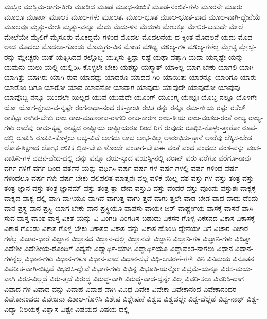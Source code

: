 {ಮುಸ್ಲಿಂ
ಮುಸ್ಲಿಮ-ರಾಗು-ತ್ತೀರಿ
ಮೂಡಿದ
ಮೂಢ
ಮೂಢ-ನಂಬಿಕೆ
ಮೂಢ-ನಂಬಿಕೆ-ಗಳು
ಮೂರನೇ
ಮೂರು
ಮೂರೂ
ಮೂರ್ಖ
ಮೂಲಕ
ಮೂಲ-ಗಳು
ಮೂಲತಃ
ಮೂಲ-ಭೂತ
ಮೂಲ-ಭೂತ-ವಾದ
ಮೂಲ-ವಾಗಿ-ದ್ದೇನೆಯೆ
ಮೂಲವೂ
ಮೃತ್ಯು-ಮೇತಿ
ಮೃತ್ಯು-ವನ್ನೂ
ಮೆದು
ಮೆದು-ಳಿನ
ಮೆದುಳು
ಮೇಲಕ್ಕೂ
ಮೇಲಿರ-ಬಹುದೇ
ಮೇಲೆ
ಮೇಲೆಯೇ
ಮೈಲಿಗೆ
ಮೈಸೂರು
ಮೊಕದ್ದಮೆ-ಗಳಿಂದ
ಮೊದಲ
ಮೊದಲನೆಯ-ದ-ಕ್ಕಿಂತ
ಮೊದಲನೆ-ಯದು
ಮೊದ-ಲಾದ
ಮೊದಲು
ಮೊದಲು-ಗೊಂಡು
ಮೊಮ್ಮಗು-ವಿನ
ಮೋಹ
ಮೌಢ್ಯ
ಮೌಲ್ಯ-ಗಳ
ಮೌಲ್ಯ-ಗಳೆಲ್ಲ
ಮ್ಲೇಚ್ಛ
ಮ್ಲೇಚ್ಛ-ರನ್ನು
ಮ್ಲೇಚ್ಛರು
ಯತೆ
ಯತ್ನಿಸಿದವ-ರಲ್ಲೊಬ್ಬ
ಯತ್ನಿಸು-ತ್ತಿದ್ದಾ-ರಷ್ಟೆ
ಯಥಾ-ವತ್ತಾಗಿ
ಯದಾ
ಯನ್ನಷ್ಟೇ
ಯನ್ನು
ಯಮನು
ಯಲು
ಯಲ್ಲಿ
ಯಲ್ಲಿರಿಸಿ-ಕೊಳ್ಳಲೇ-ಬೇಕು
ಯಶಸ್ಸು
ಯಸ್ಮಾತ್
ಯಾಕಿಲ್ಲ
ಯಾಗ-ಬೇಕು
ಯಾಗಲಿ
ಯಾಗಿ
ಯಾಗಿತ್ತು
ಯಾಗಿರು
ಯಾಗಿ-ರುವ
ಯಾದದ್ದು
ಯಾದರೂ
ಯಾದವ-ಗಿರಿ
ಯಾಯಿತು
ಯಾರನ್ನೂ
ಯಾರಿಗೂ
ಯಾರು
ಯಾರೊಂ-ದಿಗೂ
ಯಾರೋ
ಯಾವ
ಯಾವನೋ
ಯಾವಾಗ
ಯಾವುದು
ಯಾವುದೇ
ಯಾವುದೋ
ಯಾವುವು
ಯಾವೊಬ್ಬ-ನನ್ನೂ
ಯಿಂದಲೇ
ಯಿಲ್ಲದ
ಯುವ
ಯುವುದೇ
ಯೂಂಗ್
ಯೂಂಗ್ನ
ಯೇಭ್ಯಃ
ಯೊಬ್ಬ-ನಲ್ಲೂ
ಯೊಳಗೇ
ಯೋ
ಯೋಗ-ಕ್ಷೇಮ-ವ-ನ್ನಷ್ಟೇ
ರಂಗನಾಥಾ-ನಂದ
ರಕ್ತ-ಕ್ರಾಂತಿ
ರಚಿತ
ರನ್ನು
ರನ್ನೂ
ರಮ-ಣೀಯ
ರಷ್ಟು
ರಸೆಲ್
ರಾಕೆಟ್ಟು
ರಾಗಿರ-ಬೇಕು
ರಾಜ
ರಾಜ-ಮಹಾರಾಜ-ರಾಗಲಿ
ರಾಜ-ಕಾರಣ
ರಾಜ-ಕೀಯ
ರಾಜ-ವಂಶಜ-ರಂತೆ
ರಾಜ್ಯ
ರಾಜ್ಯ-ಗಳು
ರಾದೆವು
ರಾಮ-ಕೃಷ್ಣ
ರಾಷ್ಟ್ರದ
ರಾಷ್ಟ್ರೀಯ
ರಾಷ್ಟ್ರೀಯರೂ
ರಿಂದ
ರಿಗೆ
ರುವುದು
ರೂಢಿಸಿ-ಕೊಳ್ಳು-ತ್ತಾರೋ
ರೂಪ-ದಲ್ಲಿ
ರೂಪಿಸಿ
ರೂಪಿಸಿ-ಕೊಳ್ಳಲು
ಲಭ್ಯ-ವಿವೆ
ಲಾಗದು
ಲಾಭ
ಲಾಭ-ವಿಲ್ಲ
ಲಾರಂಭಿಸು-ತ್ತಾನೆ
ಲಾರೆವು
ಲೆಕ್ಕಿಸ-ಬೇಡ
ಲೋಕ-ಶಿಕ್ಷಣದ
ಲೋಭ
ಲೌಕಿಕ
ಲ್ಲಿಡ-ಬೇಕು
ಳೊಂದೇ
ವಂತಾಗ-ಬೇಕುಈ
ವಂತೆ
ವಂಥ
ವಂಥದು
ವಂಶ-ವನ್ನು
ವಂಶ-ವಾಹಿನಿ-ಗಳ
ವಚನ-ವೇದ-ದಲ್ಲಿ
ವನ್ನು
ವನ್ನೂ
ವಯ-ಸ್ಸಾದ
ವಯಸ್ಸಿ-ನಲ್ಲಿ
ವರಾನ್
ವರು
ವರೆಗೂ
ವರೆಗೂ-ನಾವು
ವರ್ಗ-ಗಳಿಗೆ
ವರ್ಗ-ದಿಂದ
ವರ್ತನೆ-ಯನ್ನು
ವರ್ಧಿಸಿ
ವರ್ಷ
ವರ್ಷ-ಗಳ
ವರ್ಷ-ಗಳಲ್ಲಿ
ವರ್ಷ-ಗಳಿಂದ
ವರ್ಷ-ಗಳಿಂದಲೂ
ವರ್ಷ-ಗಳು
ವರ್ಷ-ಬೇಕು
ವಲಿಪಲಿತ-ಮಾತ್ಮನಃ
ವಲ್ಲ
ವಳಿಕೆ-ಯಿಲ್ಲ
ವಶ
ವಸ್ತು-ಗಳ
ವಸ್ತು-ತಂತ್ರ
ವಸ್ತು-ತಂತ್ರ-ಜ್ಞಾನ
ವಸ್ತು-ತಂತ್ರ-ಜ್ಞಾನಮ್
ವಸ್ತು-ತಂತ್ರ-ತ್ವಾ-ದೇವ
ವಸ್ತುವಿ
ವಸ್ತು-ವೆಂದರೆ
ವಸ್ತು-ವೊಂದು
ವಸ್ತುಶಃ
ವಾಕ್ಯಕ್ಕೆ
ವಾಕ್ಯದ
ವಾಕ್ಯ-ದಲ್ಲಿ
ವಾಗಿ
ವಾಗಿಯೂ
ವಾಗಿವೆ
ವಾಗುತ್ತ
ವಾಗು-ತ್ತದೆ
ವಾಗು-ತ್ತಲೇ
ವಾಡ-ಬೇಡ
ವಾದ
ವಾದು-ದೆಂದು
ವಾನ-ಪ್ರಸ್ಥ
ವಾನ-ಪ್ರಸ್ಥಿ-ಯಾಗ-ಬೇಕು
ವಾನ-ಪ್ರಸ್ಥಿಯೂ
ವಾಪಸು
ವಾಯೇ-ಜರ್
ವಾರ್ಷ್ಣೇಯ
ವಾಸಕ್ಕೆ
ವಾಸನೆ
ವಾಸಿ-ಸುವ
ವಾಸ್ತ-ವಾಂಶ
ವಾಸ್ತ-ವಿಕತೆ-ಯನ್ನು
ವಿ
ವಿಂಗಡಿ
ವಿಂಗಡಿಸ-ಬಹುದು
ವಿಕಸನ-ಗೊಳ್ಳ
ವಿಕಸನದ
ವಿಕಾಸ
ವಿಕಾಸಕ್ಕೆ
ವಿಕಾಸ-ಗೊಂಡು
ವಿಕಾಸ-ಗೊಳ್ಳ-ಬೇಕು
ವಿಕಾಸದ
ವಿಕಾಸ-ವನ್ನು
ವಿಕಾಸ-ಹೊಂದಿ-ದ್ದೇನೆಯೇ
ವಿಗೆ
ವಿಚಾರ
ವಿಚಾರ-ಗಳೆಲ್ಲ
ವಿಚಾರ-ಧಾರೆ
ವಿಜ್ಞಾನ
ವಿಜ್ಞಾನದ
ವಿಜ್ಞಾನ-ದಲ್ಲಿ
ವಿಜ್ಞಾನವೇ
ವಿಜ್ಞಾನಿ
ವಿಜ್ಞಾನಿ-ಗಳ
ವಿಜ್ಞಾನಿ-ಗಳು
ವಿದಿತ್ವಾ
ವಿದೇಶೀ
ವಿದೇಶೀಯ-ರೊಂದಿಗೆ
ವಿದ್ಯತೇ
ವಿದ್ಯಾರ್ಥಿ-ಯಾಗಿ
ವಿದ್ಯಾರ್ಥಿಯೂ
ವಿದ್ಯಾವಂತ-ನಾಗಲು
ವಿಧಾನ
ವಿಧಾನ-ಗಳನ್ನೆಲ್ಲ
ವಿಧಾನ-ಗಳು
ವಿಧಾನ-ಗಳೂ
ವಿಧಾನ-ವಾದ
ವಿಧಾನ-ಸಭೆ
ವಿಧಿ-ಆಚರಣೆ-ಗಳೇ
ವಿನಿ
ವಿನಿಮಯ
ವಿನೂತನ
ವಿಪರೀತ-ವಾಗಿ-ಬಿಟ್ಟಿವೆ
ವಿಭಜಿಸಿ-ದ್ದೇವೆ
ವಿಭಾಗ-ಗಳು
ವಿಭಿನ್ನ
ವಿಭೂತಿ-ಯನ್ನೋ
ವಿಭ್ರಮೆ-ಯನ್ನೂ
ವಿರಸ-ಮಯ-ವಾಗಿ
ವಿರಸ-ವಿಲ್ಲದೆ
ವಿರು-ತ್ತದೆ
ವಿರುದ್ಧ
ವಿರುದ್ಧ-ವಾಗಿ
ವಿರುದ್ಧ-ವಾದ-ದ್ದನ್ನೇ
ವಿಲ್ಲ
ವಿವರಿ-ಸಲು
ವಿವರಿಸಿ-ದಾಗ
ವಿವಾದ-ಗಳ
ವಿವಾದ-ವನ್ನು
ವಿವಾಹ
ವಿವಾಹ-ವಾಗಿ
ವಿವಿಧ
ವಿವೇಕ
ವಿವೇಕಾ
ವಿವೇಕಾನಂದ
ವಿವೇಕಾನಂದರ
ವಿವೇಕಾನಂದರು
ವಿವೇಚನಾ
ವಿಶಾಲ-ಗೊಳಿಸಿ
ವಿಶೇಷ
ವಿಶ್ಲೇಷಣೆ
ವಿಶ್ವದ
ವಿಶ್ವದಲ್ಲೇ
ವಿಶ್ವ-ದೆಲ್ಲೆಡೆ
ವಿಶ್ವ-ನಾಥ್
ವಿಶ್ವ-ವಿದ್ಯಾ-ನಿಲಯಕ್ಕೆ
ವಿಶ್ವಾಸ
ವಿಶ್ವೇ
ವಿಷಯದ
ವಿಷಯ-ದಲ್ಲಿ
}
